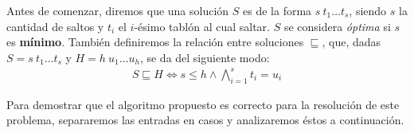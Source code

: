 \vspace*{0.3cm}

Antes de comenzar, diremos que una solución $S$ es de la forma $s \ t_1 \dots t_s$,
siendo $s$ la cantidad de saltos y $t_i$ el $i$-ésimo tablón al cual saltar. $S$ se considera
\textit{óptima} si $s$ es \textbf{mínimo}. También definiremos la relación entre soluciones $\sqsubseteq$, que,
dadas $S = s \ t_1 \dots t_s$ y $H = h \ u_1 \dots u_h$, se da del siguiente modo:
\begin{align*}
  S \sqsubseteq H \iff s \leq h \wedge \bigwedge_{i=1}^s t_i = u_i
\end{align*}

Para demostrar que el algoritmo propuesto es correcto para la resolución de este problema,
separaremos las entradas en casos y analizaremos éstos a continuación.

